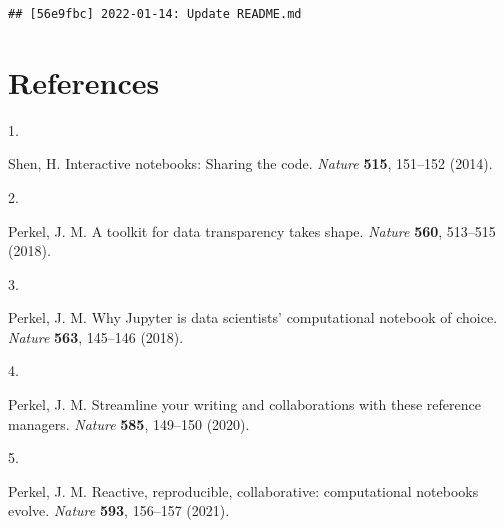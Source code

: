\documentclass[smallextended]{svjour3}       %
\newlength{\cslhangindent}
\newlength{\csllabelwidth}
\newlength{\cslentryspacingunit} %
\newenvironment{CSLReferences}[2] %
 {%
  \setlength{\parindent}{0pt}
  \ifodd #1
  \let\oldpar\par
  \def\par{\hangindent=\cslhangindent\oldpar}
  \fi
  \setlength{\parskip}{#2\cslentryspacingunit}
 }%
 {}
\newcommand{\CSLLeftMargin}[1]{\parbox[t]{\csllabelwidth}{#1}}
\newcommand{\CSLRightInline}[1]{\parbox[t]{\linewidth - \csllabelwidth}{#1}\break}
\begin{document}
\begin{verbatim}
## [56e9fbc] 2022-01-14: Update README.md
\end{verbatim}

\hypertarget{references}{%
\section*{References}\label{references}}

\hypertarget{refs}{}
\begin{CSLReferences}{0}{0}
\leavevmode\hypertarget{ref-shen2014}{}%
\CSLLeftMargin{1. }
\CSLRightInline{Shen, H. Interactive notebooks: Sharing the code. \emph{Nature} \textbf{515}, 151--152 (2014).}

\leavevmode\hypertarget{ref-perkel2018a}{}%
\CSLLeftMargin{2. }
\CSLRightInline{Perkel, J. M. A toolkit for data transparency takes shape. \emph{Nature} \textbf{560}, 513--515 (2018).}

\leavevmode\hypertarget{ref-perkel2018}{}%
\CSLLeftMargin{3. }
\CSLRightInline{Perkel, J. M. Why Jupyter is data scientists{'} computational notebook of choice. \emph{Nature} \textbf{563}, 145--146 (2018).}

\leavevmode\hypertarget{ref-perkel2020}{}%
\CSLLeftMargin{4. }
\CSLRightInline{Perkel, J. M. Streamline your writing {{}} and collaborations {{}} with these reference managers. \emph{Nature} \textbf{585}, 149--150 (2020).}

\leavevmode\hypertarget{ref-perkel2021}{}%
\CSLLeftMargin{5. }
\CSLRightInline{Perkel, J. M. Reactive, reproducible, collaborative: computational notebooks evolve. \emph{Nature} \textbf{593}, 156--157 (2021).}

\end{CSLReferences}




\end{document}
